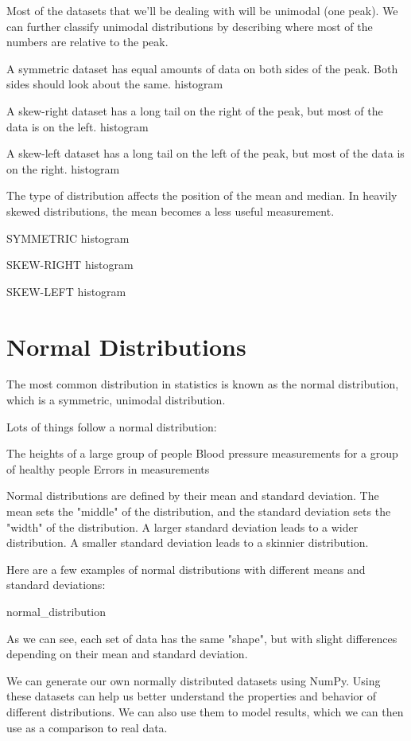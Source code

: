 \documentclass{journal}
\begin{document}
Most of the datasets that we'll be dealing with will be unimodal (one peak). We can further classify unimodal distributions by describing where most of the numbers are relative to the peak.

A symmetric dataset has equal amounts of data on both sides of the peak. Both sides should look about the same. histogram

A skew-right dataset has a long tail on the right of the peak, but most of the data is on the left. histogram

A skew-left dataset has a long tail on the left of the peak, but most of the data is on the right. histogram

The type of distribution affects the position of the mean and median. In heavily skewed distributions, the mean becomes a less useful measurement.

SYMMETRIC histogram

SKEW-RIGHT histogram

SKEW-LEFT histogram

\section{Normal Distributions}
The most common distribution in statistics is known as the normal distribution, which is a symmetric, unimodal distribution.

Lots of things follow a normal distribution:

    The heights of a large group of people
    Blood pressure measurements for a group of healthy people
    Errors in measurements

Normal distributions are defined by their mean and standard deviation. The mean sets the "middle" of the distribution, and the standard deviation sets the "width" of the distribution. A larger standard deviation leads to a wider distribution. A smaller standard deviation leads to a skinnier distribution.

Here are a few examples of normal distributions with different means and standard deviations:

normal_distribution

As we can see, each set of data has the same "shape", but with slight differences depending on their mean and standard deviation.

We can generate our own normally distributed datasets using NumPy. Using these datasets can help us better understand the properties and behavior of different distributions. We can also use them to model results, which we can then use as a comparison to real data.
\end{document}
